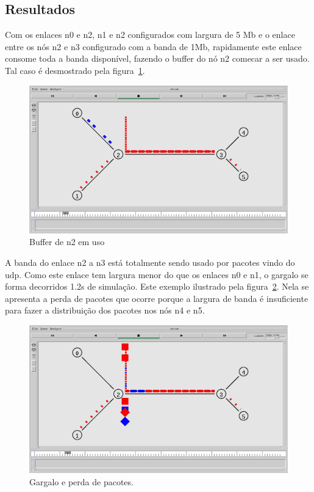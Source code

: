 \documentclass[12pt]{article}
\begin{document}
\subsection{Resultados}
Com os enlaces n0 e n2, n1 e n2  configurados com largura de 5 Mb e o enlace entre os nós n2 e n3 configurado com a banda de 1Mb, rapidamente este enlace consome toda a banda disponível, fazendo o buffer do nó n2 comecar a ser usado. Tal caso é desmostrado pela figura~\ref{fig:buffer}. 

\begin{figure}[ht]
\centering
\includegraphics[width=.9\textwidth]{buffer.jpg}
\caption { Buffer de n2 em uso}
\label{fig:buffer}
\end{figure}

A banda do enlace n2 a n3 está totalmente sendo usado por pacotes vindo do udp. Como este enlace tem largura menor do que os enlaces n0 e n1, o gargalo se forma decorridos 1.2s de simulação. Este exemplo ilustrado pela figura~\ref{fig:gargalo}. Nela se apresenta a perda de pacotes que ocorre porque a largura de banda é insuficiente para fazer a distribuição dos pacotes nos nós n4 e n5.

\begin{figure}[ht]
\centering
\includegraphics[width=.9\textwidth]{gargalo.jpg}
\caption { Gargalo e perda de pacotes.}
\label{fig:gargalo}
\end{figure}
\end{document}
